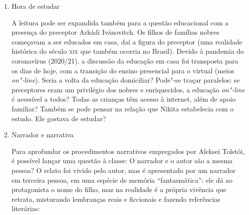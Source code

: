 \documentclass{article}
\begin{document}
\begin{enumerate}
Quem não se lembra dos passatempos da meninice? Seja pega"-pega ou
\emph{game}? A história de Nikita permite refletir sobre as brincadeiras
de ontem e de hoje: o educando cria suas próprias memórias. Como
observou Mountian (2021, Paratexto), enquanto Lília, o primeiro amor de
Nikita, se ocupava com atividades caseiras (brincar de boneca, costurar,
etc.), os meninos brincavam ao ar livre e faziam seus próprios
brinquedos, como vemos nos primeiros capítulos. Posteriormente, surge o
tema da guerra, brincadeira clássica de meninos. No capítulo ``A
batalha'', há uma luta entre os garotos ``do nosso lado'' e os ``do
outro lado'', e Nikita dá uma surra no valentão Stiopka Karnaúchkin,
que, impressionado, convida"-o para ser seu amigo. Como são essas
relações na atualidade? Há diferenças? Meninos e meninas ainda se
dividem dessa maneira?

Outras questões sugeridas: Quais eram os meios de diversão dos russos
no século \textsc{xix} que aparecem no livro? Será que eles permanecem na
atualidade? As brincadeiras na neve, como o esqui, o trenó, teriam,
quiçá, equivalentes no Brasil (talvez no \emph{skate}, no surfe)? Quais
são os entretenimentos da infância e da adolescência hoje? Ocorrem
dentro ou fora de casa? São atividades coletivas ou individuais?
Envolvem trabalho manual?

\item
Hora de estudar

A leitura pode ser expandida também para a questão educacional com a
presença do preceptor Arkádi Ivánovitch. Os filhos de famílias nobres
começavam a ser educados em casa, daí a figura do preceptor (uma
realidade histórica do século \textsc{xix} que também ocorria no Brasil). Devido
à pandemia do coronavírus (2020/21), a discussão da educação em casa foi
transposta para os dias de hoje, com a transição do ensino presencial
para o virtual (meios \emph{on"-line}). Seria a volta da educação
domiciliar? Pode"-se traçar paralelos: se preceptores eram um privilégio
dos nobres e enriquecidos, a educação \emph{on"-line} é acessível a
todos? Todas as crianças têm acesso à internet, além de apoio familiar?
Também se pode pensar na relação que Nikita estabelecia com o estudo.
Ele gostava de estudar?

\item
Narrador e narrativa

Para aprofundar os procedimentos narrativos empregados por Aleksei
Tolstói, é possível lançar uma questão à classe: O narrador e o autor
são a mesma pessoa? O relato foi vivido pelo autor, mas é apresentado
por um narrador em terceira pessoa, em uma espécie de memória
``fantasmática'': ele dá ao protagonista o nome do filho, mas na
realidade é a própria vivência que retrata, misturando lembranças reais
e ficcionais e fazendo referências literárias:


\end{enumerate}
\end{document}
